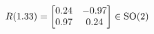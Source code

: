 \documentclass[preview]{standalone}
\begin{document}
\begin{align*}
\special{dvisvgm:raw <g id='unique000'>}R(1.33) = \begin{bmatrix} 0.24 & -0.97 \\ 0.97 & 0.24 \end{bmatrix} \in \text{SO}(2)\special{dvisvgm:raw </g>}
\end{align*}
\end{document}
